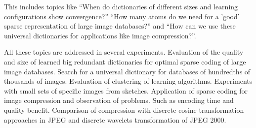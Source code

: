 This includes topics like 
``When do dictionaries of different sizes and learning configurations show
convergence?'' 
``How many atoms do we need for a 'good' sparse representation of large image
databases?''  and 
``How can we use these universal dictionaries for applications like
image compression?''. 

All these topics are addressed in several experiments.
Evaluation of the quality and size of learned big redundant dictionaries
for optimal sparse coding of large image databases. Search for a universal
dictionary for databases of hundredths of thousands of images. Evaluation of
clustering of learning algorithms. Experiments with small sets of specific
images from sketches. 
Application of sparse coding for image compression and observation of problems.
Such as encoding time and quality benefit. Comparison of compression with
discrete cosine transformation approaches in JPEG and discrete wavelets
transformation of JPEG 2000.




